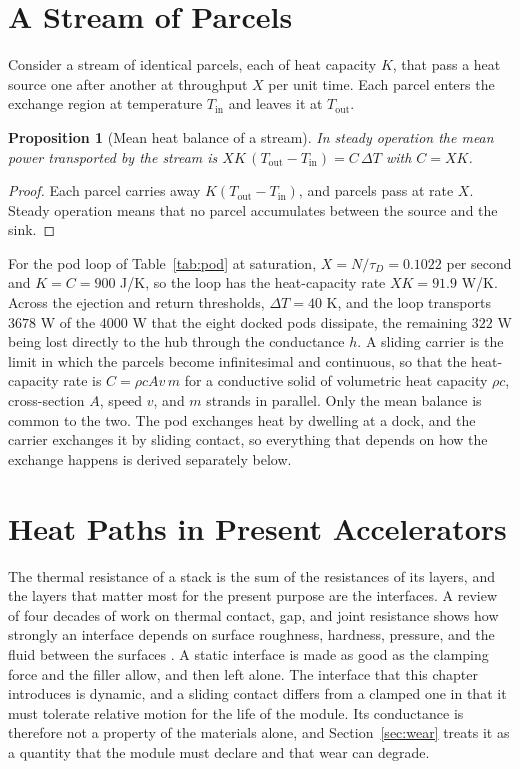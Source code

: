 \documentclass[11pt,openany]{book}
\theoremstyle{plain}
\newtheorem{proposition}[theorem]{Proposition}
\theoremstyle{definition}
\theoremstyle{remark}
\begin{document}
\section{A Stream of Parcels}
\label{sec:stream}

Consider a stream of identical parcels, each of heat capacity $K$, that pass a heat source one after another at throughput $X$ per unit time. Each parcel enters the exchange region at temperature $T_{\mathrm{in}}$ and leaves it at $T_{\mathrm{out}}$.

\begin{proposition}[Mean heat balance of a stream]
\label{prop:stream}
In steady operation the mean power transported by the stream is $X K\,(T_{\mathrm{out}}-T_{\mathrm{in}})=C\,\Delta T$ with $C=XK$.
\end{proposition}
\begin{proof}
Each parcel carries away $K(T_{\mathrm{out}}-T_{\mathrm{in}})$, and parcels pass at rate $X$. Steady operation means that no parcel accumulates between the source and the sink.
\end{proof}

For the pod loop of Table~\ref{tab:pod} at saturation, $X=N/\tau_D=0.1022$ per second and $K=C=900$ J/K, so the loop has the heat-capacity rate $XK=91.9$ W/K. Across the ejection and return thresholds, $\Delta T=40$ K, and the loop transports $3678$ W of the $4000$ W that the eight docked pods dissipate, the remaining $322$ W being lost directly to the hub through the conductance $h$. A sliding carrier is the limit in which the parcels become infinitesimal and continuous, so that the heat-capacity rate is $C=\rho c A v\,m$ for a conductive solid of volumetric heat capacity $\rho c$, cross-section $A$, speed $v$, and $m$ strands in parallel. Only the mean balance is common to the two. The pod exchanges heat by dwelling at a dock, and the carrier exchanges it by sliding contact, so everything that depends on how the exchange happens is derived separately below.

\section{Heat Paths in Present Accelerators}
\label{sec:paths}

The thermal resistance of a stack is the sum of the resistances of its layers, and the layers that matter most for the present purpose are the interfaces. A review of four decades of work on thermal contact, gap, and joint resistance shows how strongly an interface depends on surface roughness, hardness, pressure, and the fluid between the surfaces \cite{yovanovich}. A static interface is made as good as the clamping force and the filler allow, and then left alone. The interface that this chapter introduces is dynamic, and a sliding contact differs from a clamped one in that it must tolerate relative motion for the life of the module. Its conductance is therefore not a property of the materials alone, and Section~\ref{sec:wear} treats it as a quantity that the module must declare and that wear can degrade.
\end{document}
